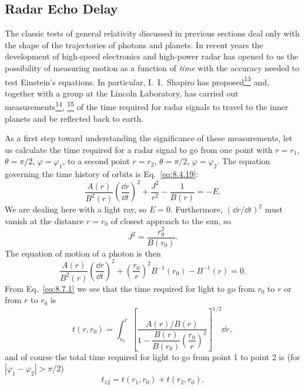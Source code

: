 
\subsection{Radar Echo Delay}\label{sec:8.7}

The classic tests of general relativity discussed in previous sections deal
only with the shape of the trajectories of photons and planets. In recent
years the development of high-speed electronics and high-power radar has
opened to us the possibility of measuring motion as a function of
\emph{time} with the accuracy needed to test Einstein's equations. In
particular, I.~I.~Shapiro has
proposed\hyperref[ch8-ref-13]{\textsuperscript{13}} and, together with a
group at the Lincoln Laboratory, has carried out
measurements\hyperref[ch8-ref-14]{\textsuperscript{14}},%
\hyperref[ch8-ref-15]{\textsuperscript{15}} of the time required for radar
signals to travel to the inner planets and be reflected back to earth.

As a first step toward understanding the significance of these measurements,
let us calculate the time required for a radar signal to go from one point
with \(r=r_1\), \(\theta=\pi/2\), \(\varphi=\varphi_1\), to a second point
\(r=r_2\), \(\theta=\pi/2\), \(\varphi=\varphi_2\). The equation governing
the time history of orbits is Eq.~\eqref{eq:8.4.19}:
\[
  \frac{A(r)}{B^2(r)}
  \left(\frac{\dd r}{\dd t}\right)^2
  +\frac{J^2}{r^2}
  -\frac{1}{B(r)}
  =-E.
\]
We are dealing here with a light ray, so \(E=0\). Furthermore,
\((\dd r/\dd t)^2\) must vanish at the distance \(r=r_0\) of closest approach to
the sun, so
\[
  J^2=\frac{r_0^2}{B(r_0)}.
\]
The equation of motion of a photon is then
\begin{equation}
  \frac{A(r)}{B^2(r)}
  \left(\frac{\dd r}{\dd t}\right)^2
  +\left(\frac{r_0}{r}\right)^2B^{-1}(r_0)
  -B^{-1}(r)
  =0.
  \tag{8.7.1}\label{eq:8.7.1}
\end{equation}
From Eq.~\eqref{eq:8.7.1} we see that the time required for light to go
from \(r_0\) to \(r\) or from \(r\) to \(r_0\) is
\begin{equation}
  t(r,r_0)
  =
  \int_{r_0}^{r}
  \left[
    \frac{A(r)/B(r)}
    {1-\dfrac{B(r)}{B(r_0)}\left(\dfrac{r_0}{r}\right)^2}
  \right]^{1/2}\dd r,
  \tag{8.7.2}\label{eq:8.7.2}
\end{equation}
and of course the total time required for light to go from point 1 to
point 2 is (for \(|\varphi_1-\varphi_2|>\pi/2\))
\begin{equation}
  t_{12}=t(r_1,r_0)+t(r_2,r_0).
  \tag{8.7.3}\label{eq:8.7.3}
\end{equation}

